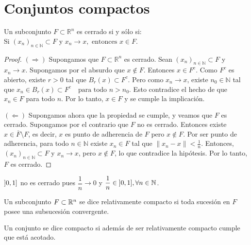 \clearpage
\section{Conjuntos compactos}

\begin{theorem}
  Un subconjunto \(F \subset \mathbb{R}^n\) es cerrado si y sólo si:
  \(\text{Si } {(x_n)}_{n \in \mathbb{N}} \subset F \text{ y } x_n \to x, \text{ entonces } x \in F\).
  \begin{proof}
    \((\Rightarrow)\) Supongamos que \(F \subset \mathbb{R}^n\) es cerrado.
    Sean \({(x_n)}_{n \in \mathbb{N}} \subset F\) y \(x_n \to x\).
    Supongamos por el absurdo que \(x \notin F\). Entonces \(x \in F^c\).
    Como \(F^c\) es abierto, existe \(r > 0\) tal que \(B_r(x) \subset F^c\).
    Pero como \(x_n \to x\), existe \(n_0 \in \mathbb{N} \) tal que
    \(x_n \in B_r(x) \subset F^c \quad \text{para todo } n > n_0\).
    Esto contradice el hecho de que \(x_n \in F\) para todo \(n\).
    Por lo tanto, \(x \in F\) y se cumple la implicación.

    \medskip

    \((\Leftarrow)\) Supongamos ahora que la propiedad se cumple, y veamos que \(F\) es cerrado.
    Supongamos por el contrario que \(F\) no es cerrado. Entonces existe \(x \in \overline{F} \setminus F\),
    es decir, \(x\) es punto de adherencia de \(F\) pero \(x \notin F\).
    Por ser punto de adherencia, para todo \(n \in \mathbb{N} \) existe \(x_n \in F\) tal que
    \( \|x_n - x\| < \frac{1}{n}\).
    Entonces, \({(x_n)}_{n \in \mathbb{N}} \subset F\) y \(x_n \to x\), pero \(x \notin F\),
    lo que contradice la hipótesis. Por lo tanto, \(F\) es cerrado.
  \end{proof}
\end{theorem}

\begin{eg}
  \( \interval[open left]{0}{1}\) no es cerrado pues \(\dfrac{1}{n} \to 0\) y \(\dfrac{1}{n} \in \interval[open left]{0}{1}, \forall n \in \N \).
\end{eg}

\begin{definition}
  Un subconjunto \(F \subset \mathbb{R}^n\) se dice relativamente compacto si toda sucesión en \(F\) posee una subsucesión convergente.
\end{definition}

\begin{definition}[Compacto]
  Un conjunto se dice compacto si además de ser relativamente compacto cumple que está acotado.
\end{definition}

